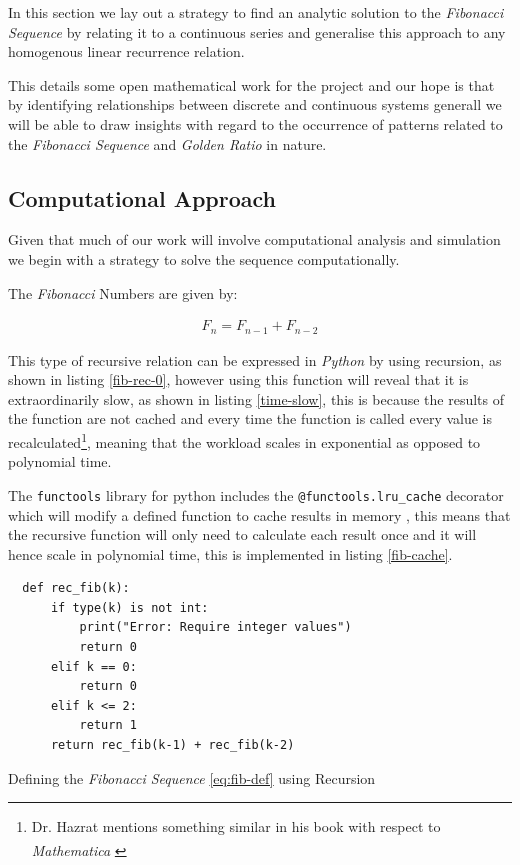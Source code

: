 \documentclass[11pt]{article}
\begin{document}
In this section we lay out a strategy to find an analytic solution to the
\emph{Fibonacci Sequence} by relating it to a continuous series and generalise this
approach to any homogenous linear recurrence relation.

This details some open mathematical work for the project and our hope is that by
identifying relationships between discrete and continuous systems generall we
will be able to draw insights with regard to the occurrence of patterns related
to the \emph{Fibonacci Sequence} and \emph{Golden Ratio} in nature.

\subsection{Computational Approach}
\label{define-the-fibonacci-numbers}
Given that much of our work will involve computational analysis and simulation we begin with a strategy to solve the sequence computationally.

The \emph{Fibonacci} Numbers are given by:

\begin{align}
F_n = F_{n-1} + F_{n-2} \label{eq:fib-def}
\end{align}

This type of recursive relation can be expressed in \emph{Python} by using recursion,
as shown in listing \ref{fib-rec-0}, however using this function will reveal that it
is extraordinarily slow, as shown in listing \ref{time-slow}, this is because the
results of the function are not cached and every time the function is called
every value is recalculated\footnote{Dr. Hazrat mentions something similar in his book with respect to
\emph{Mathematica}\textsuperscript{\textregistered}
\cite[Ch. 13]{hazratMathematicaProblemCenteredApproach2015}}, meaning that the workload scales in
exponential as opposed to polynomial time.

The \texttt{functools} library for python includes the \texttt{@functools.lru\_cache} decorator
which will modify a defined function to cache results in memory
\cite{FunctoolsHigherorderFunctions}, this means that the recursive function will
only need to calculate each result once and it will hence scale in polynomial
time, this is implemented in listing \ref{fib-cache}.


\begin{listing}[htbp]
\begin{verbatim}
  def rec_fib(k):
      if type(k) is not int:
          print("Error: Require integer values")
          return 0
      elif k == 0:
          return 0
      elif k <= 2:
          return 1
      return rec_fib(k-1) + rec_fib(k-2)
\end{verbatim}
\caption{\label{fib-rec-0}Defining the \emph{Fibonacci Sequence} \eqref{eq:fib-def} using Recursion}
\end{listing}
\end{document}

